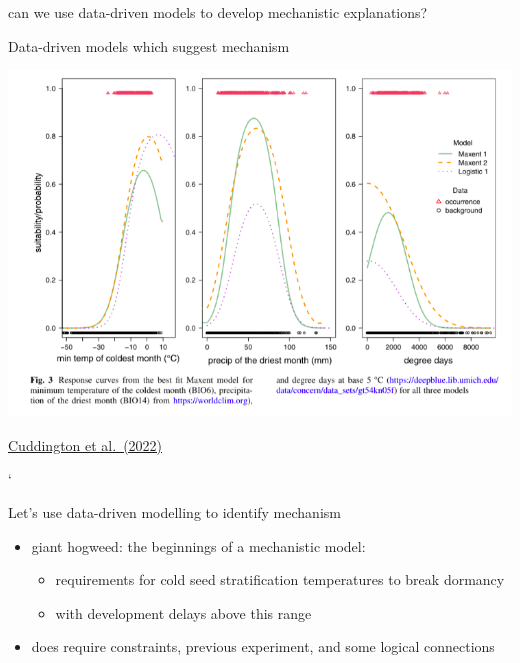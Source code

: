 \documentclass[
  ignorenonframetext,
]{beamer}
\providecommand{\tightlist}{%
  \setlength{\itemsep}{0pt}\setlength{\parskip}{0pt}}
\begin{document}
\begin{frame}{can we use data-driven models to develop mechanistic
explanations?}
\begin{block}{Data-driven models which suggest mechanism}
\begin{center}\includegraphics[width=0.8\linewidth]{modelshogweed} \end{center}

\href{https://doi.org/10.1007/s10530-021-02645-x}{Cuddington et
al.~(2022)}

`
\end{block}

\begin{block}{Let's use data-driven modelling to identify mechanism}
\protect\hypertarget{lets-use-data-driven-modelling-to-identify-mechanism}{}
\begin{itemize}
\tightlist
\item
  giant hogweed: the beginnings of a mechanistic model:

  \begin{itemize}
  \tightlist
  \item
    requirements for cold seed stratification temperatures to break
    dormancy
  \item
    with development delays above this range
  \end{itemize}
\item
  does require constraints, previous experiment, and some logical
  connections
\end{itemize}
\end{block}
\end{frame}
\end{document}

